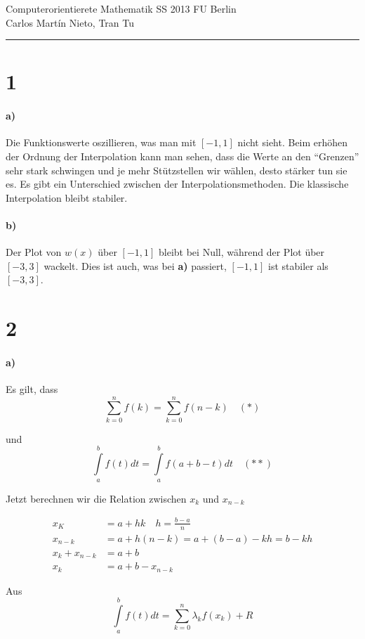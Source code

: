 \documentclass[ngerman,a4paper]{scrartcl}
\begin{document}
{\sffamily
  \hfill
  Computerorientierete Mathematik SS 2013\hfill
  FU Berlin\\[8pt]
  \hfill Carlos Martín Nieto, Tran Tu\hrule \bigskip
}

\section*{1}

\paragraph{a)}

Die Funktionswerte oszillieren, was man mit $[-1,1]$ nicht sieht. Beim
erhöhen der Ordnung der Interpolation kann man sehen, dass die Werte
an den "`Grenzen"' sehr stark schwingen und je mehr Stützstellen wir
wählen, desto stärker tun sie es. Es gibt ein Unterschied zwischen der
Interpolationsmethoden. Die klassische Interpolation bleibt stabiler.

\paragraph{b)}

Der Plot von $w(x)$ über $[-1,1]$ bleibt bei Null, während der Plot
über $[-3,3]$ wackelt. Dies ist auch, was bei \textbf{a)} passiert,
$[-1,1]$ ist stabiler als $[-3,3]$.

\section*{2}
\paragraph{a)}
Es gilt, dass
\[
\sum^n_{k=0} f(k) = \sum^n_{k=0} f(n-k) \quad (*)
\]

und
\[
\int\limits^b_a f(t) dt = \int\limits^b_a f(a+b-t) dt \quad (**)
\]

Jetzt berechnen wir die Relation zwischen $x_k$ und $x_{n-k}$

\begin{align*}
  x_K &= a+hk\quad h = \frac{b-a}{n}\\
  x_{n-k} &= a+h(n-k) = a+(b-a) - kh = b-kh\\
  x_k + x_{n-k} &= a+b\\
  x_k &= a+b-x_{n-k}
\end{align*}

Aus
\[
\int\limits^b_a f(t) dt = \sum^n_{k=0} \lambda_k f(x_k) + R
\]
\end{document}
